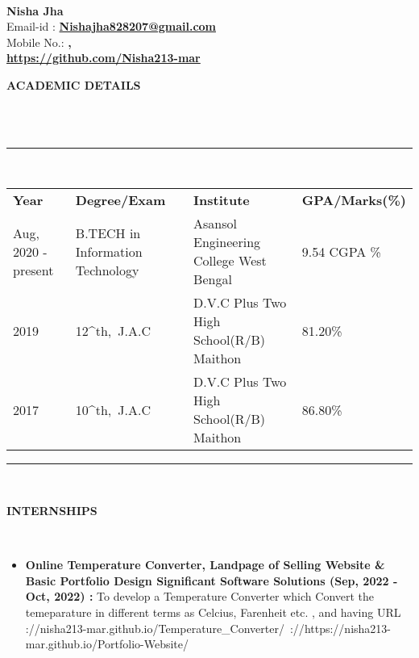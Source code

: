 \documentclass[a4paper,10pt]{article}
\newcommand{\lsep}{-0.5cm}
\newcommand{\resheading}[1]{{\small \colorbox{mygrey}{\begin{minipage}{0.975\textwidth}{\textbf{#1 \vphantom{p\^{E}}}}\end{minipage}}}}
\begin{document}
\hspace{0.5cm}\\[-0.2cm]
 
\textbf{Nisha Jha} \\
\indent Email-id : \textbf{\url{Nishajha828207@gmail.com}} \\
\indent Mobile No.: \textbf, \ \\
\indent \textbf{\url{https://github.com/Nisha213-mar}}\\
 
\resheading{\textbf{ACADEMIC DETAILS} }\\[\lsep]
\\
\indent \rule{6.8in}{0.4pt}\\
\indent \begin{tabular}{ l @{\hskip 0.15in} l @{\hskip 0.15in} l @{\hskip 0.15in} l @{\hskip 0.15in} }
\noindent \textbf{Year} & \textbf{Degree/Exam} & \textbf{Institute} & \textbf{GPA/Marks(\%)}\\

Aug, 2020 - present & B.TECH in Information Technology & Asansol Engineering College West Bengal & 9.54 CGPA \% \\
2019 & 12^{th},\ J.A.C & D.V.C Plus Two High School(R/B) Maithon &  81.20\% \\
2017 & 10^{th},\ J.A.C & D.V.C Plus Two High School(R/B) Maithon &  86.80\% \\
 
\end{tabular}

\indent \rule{6.8in}{0.4pt}
\\
 

\resheading{\textbf{INTERNSHIPS} }\\[\lsep]
\begin{itemize}
\setlength\itemsep{0.5em}
\item \textbf{Online Temperature Converter, Landpage of Selling Website & Basic Portfolio Design Significant Software Solutions (Sep, 2022 - Oct, 2022) : }To develop
a Temperature Converter which Convert the temeparature in different terms as
Celcius, Farenheit etc.
, and having URL \urlhttps://{nisha213-mar.github.io/Temperature_Converter/}\
\urlhttps://{https://nisha213-mar.github.io/Portfolio-Website/}

\end{itemize}
 
\end{document}
